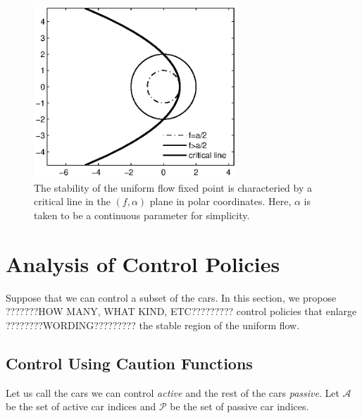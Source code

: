\documentclass[10pt,twocolumn]{article}
\newcommand{\lm}{\fontfamily{\sfdefault}\selectfont}
\begin{document}
\begin{figure}[!h]
\lm
\begin{center}
\includegraphics[width=3in]{stblregion}
\end{center}
\caption{ \label{fig:stblregion} The stability of the uniform flow fixed point is characteried by a critical line in the $(f,\alpha)$ plane in polar coordinates. Here, $\alpha$ is taken to be a continuous parameter for simplicity.}
\end{figure}

\section{Analysis of Control Policies}
Suppose that we can control a subset of the cars. In this section, we propose ???????HOW MANY, WHAT KIND, ETC????????? control policies that enlarge ????????WORDING????????? the stable region of the uniform flow.  

\subsection{Control Using Caution Functions}
Let us call the cars we can control {\em active} and the rest of the cars {\em passive}. Let $\mathcal{A}$ be the set of active car indices and $\mathcal{P}$ be the set of passive car indices. 

\end{document}
